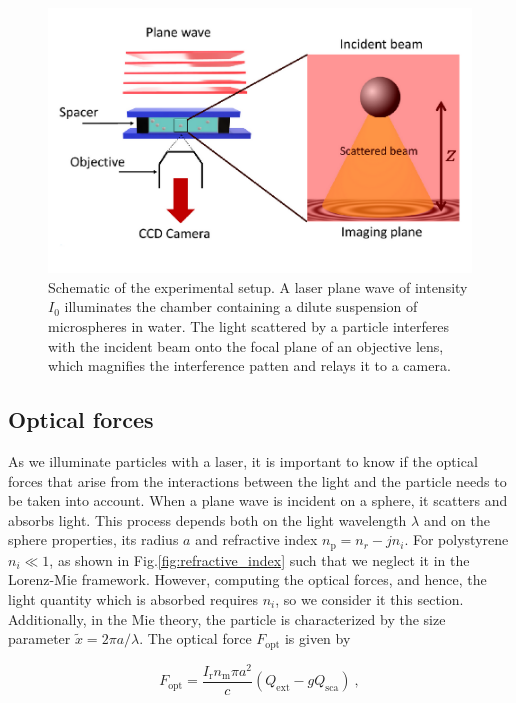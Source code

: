 \begin{figure}[!ht]
	\centering
	\includegraphics[scale=0.9]{02_body/chapter2/images/figures_setup/schema_setup.pdf}
	\caption{Schematic of the experimental setup. A laser plane wave of intensity $I_0$ illuminates the chamber containing a dilute suspension of microspheres in water. The light scattered by a particle interferes with the incident beam onto the focal plane of an objective lens, which magnifies the interference patten and relays it to a camera.}
	\label{fig:schema}
\end{figure}


\subsection{Optical forces}

As we illuminate particles with a laser, it is important to know if the optical forces that arise from the interactions between the light and the particle needs to be taken into account. When a plane wave is incident on a sphere, it scatters and absorbs light. This process depends both on the light wavelength $\lambda$ and on the sphere properties, its radius $a$ and refractive index $n_\mathrm{p} = n_{r} - jn_i$. For polystyrene $n_i \ll 1$, as shown in Fig.\ref{fig:refractive_index} such that we neglect it in the Lorenz-Mie framework. However, computing the optical forces, and hence, the light quantity which is absorbed requires $n_i$, so we consider it this section. Additionally, in the Mie theory, the particle is characterized by the size parameter $\tilde{x}= 2\pi a /\lambda$. The optical force $F_\mathrm{opt}$ is given by \cite{f_bohren_absorption_1998}

\begin{equation}
	F_\mathrm{opt} = \frac{I_\mathrm{r} n_\mathrm{m} \pi a^2 }{c} (Q_\mathrm{ext} - gQ_\mathrm{sca}) ~,
	\label{Eq.Fopt}
\end{equation}

